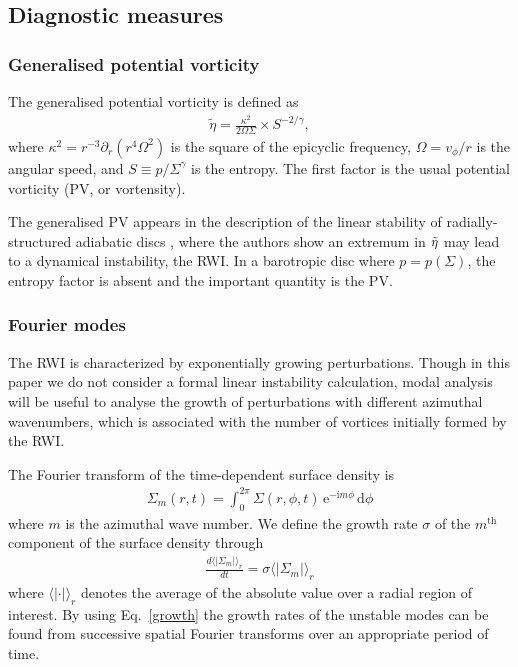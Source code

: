 \subsection{Diagnostic measures}

\subsubsection{Generalised potential vorticity}

The generalised potential vorticity is defined as
\begin{align}
  \tilde{\eta} = \frac{\kappa^2}{2\Omega\Sigma}\times S^{-2/\gamma}, 
\end{align}
where $\kappa^2 = r^{-3}\partial_r(r^4\Omega^2)$ is the square of the
epicyclic frequency, $\Omega=v_\phi/r$ is the angular speed, and
$S\equiv p/\Sigma^\gamma$ is the entropy. The first factor is the
usual potential vorticity (PV, or vortensity). 

The generalised PV appears in the description of the linear stability
of radially-structured adiabatic discs \citep{lovelace99,li00}, where
the authors show an extremum in $\tilde{\eta}$ may lead to a dynamical
instability, the RWI. In a barotropic disc where $p=p(\Sigma)$, the entropy factor is 
absent and the important quantity is the PV. 

\subsubsection{Fourier modes} 
The RWI is characterized by exponentially
growing perturbations. Though in this paper we do not consider a
formal linear instability calculation, modal analysis will be useful
to analyse the growth of perturbations with different azimuthal
wavenumbers, which is associated with the number of vortices initially
formed by the RWI.    

The Fourier transform of the time-dependent surface density is
\begin{align}\label{fouriertransform}
  \Sigma_m(r,t) = \int_{0}^{2\pi}
  \Sigma(r,\phi,t) \, \mathrm{e}^{-\mathrm{i}m\phi} \, \mathrm{d}\phi 
\end{align} 
where $m$ is the azimuthal wave number. We define the growth rate
$\sigma$ of the $m^\mathrm{th}$ component of the surface density
through 
\begin{align}\label{growth}
  \frac{d \langle|\Sigma_m|\rangle_r }{dt}= \sigma \langle|\Sigma_m|\rangle_r 
\end{align}
where %
$\langle|\cdot|\rangle_r$ denotes the average of the absolute value
over a radial region of interest. By using Eq.~\ref{growth} the growth
rates of the unstable modes can be found from successive spatial
Fourier transforms over an appropriate period of time. 

